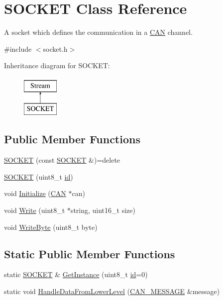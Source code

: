 \hypertarget{class_s_o_c_k_e_t}{}\section{S\+O\+C\+K\+ET Class Reference}
\label{class_s_o_c_k_e_t}


A socket which defines the communication in a \hyperlink{class_c_a_n}{C\+AN} channel.  




{\ttfamily \#include $<$socket.\+h$>$}

Inheritance diagram for S\+O\+C\+K\+ET\+:\begin{figure}[H]
\begin{center}
\leavevmode
\includegraphics[height=2.000000cm]{class_s_o_c_k_e_t}
\end{center}
\end{figure}
\subsection*{Public Member Functions}
\begin{DoxyCompactItemize}
\item 
\hyperlink{class_s_o_c_k_e_t_a354625580716401ca8444fd01b99e89e}{S\+O\+C\+K\+ET} (const \hyperlink{class_s_o_c_k_e_t}{S\+O\+C\+K\+ET} \&)=delete
\item 
\hyperlink{class_s_o_c_k_e_t_ab87e109918e43ba097c153114f4f6494}{S\+O\+C\+K\+ET} (uint8\+\_\+t \hyperlink{class_s_o_c_k_e_t_a0755fe74751c2d94d3d1679cad9e6544}{id})
\item 
void \hyperlink{class_s_o_c_k_e_t_a69219c6c89e78afcd46df2e0af34a341}{Initialize} (\hyperlink{class_c_a_n}{C\+AN} $\ast$can)
\item 
void \hyperlink{class_s_o_c_k_e_t_ad8ee6b81c9f30267406412a95264abed}{Write} (uint8\+\_\+t $\ast$string, uint16\+\_\+t size)
\item 
void \hyperlink{class_s_o_c_k_e_t_abcddb460b7adf3595a813f08f3659356}{Write\+Byte} (uint8\+\_\+t byte)
\end{DoxyCompactItemize}
\subsection*{Static Public Member Functions}
\begin{DoxyCompactItemize}
\item 
static \hyperlink{class_s_o_c_k_e_t}{S\+O\+C\+K\+ET} \& \hyperlink{class_s_o_c_k_e_t_acd81e49443c51d84f7bfe5d616d1b750}{Get\+Instance} (uint8\+\_\+t \hyperlink{class_s_o_c_k_e_t_a0755fe74751c2d94d3d1679cad9e6544}{id}=0)
\item 
static void \hyperlink{class_s_o_c_k_e_t_ab1345aded87c899fd525616b6f2cca4a}{Handle\+Data\+From\+Lower\+Level} (\hyperlink{struct_c_a_n___m_e_s_s_a_g_e}{C\+A\+N\+\_\+\+M\+E\+S\+S\+A\+GE} \&message)
\end{DoxyCompactItemize}
